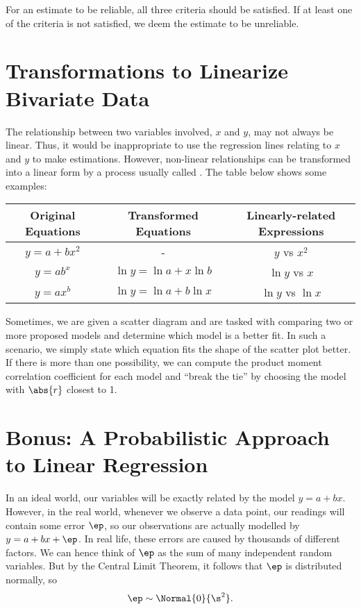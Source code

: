 For an estimate to be reliable, all three criteria should be satisfied. If at least one of the criteria is not satisfied, we deem the estimate to be unreliable.

\section{Transformations to Linearize Bivariate Data}

The relationship between two variables involved, $x$ and $y$, may not always be linear. Thus, it would be inappropriate to use the regression lines relating to $x$ and $y$ to make estimations. However, non-linear relationships can be transformed into a linear form by a process usually called . The table below shows some examples:

\begin{table}[H]
    \centering
    \begin{tabular}{|c|c|c|}
        \hline
        \textbf{Original Equations} & \textbf{Transformed Equations} & \textbf{Linearly-related Expressions} \\ \hline
        $y = a + bx^2$ & - & $y$ vs $x^2$ \\ \hline
        $y = ab^x$ & $\ln y = \ln a + x \ln b$ & $\ln y$ vs $x$ \\ \hline
        $y = ax^b$ & $\ln y = \ln a + b \ln x$ & $\ln y$ vs $\ln x$ \\ \hline
    \end{tabular}
\end{table}

Sometimes, we are given a scatter diagram and are tasked with comparing two or more proposed models and determine which model is a better fit. In such a scenario, we simply state which equation fits the shape of the scatter plot better. If there is more than one possibility, we can compute the product moment correlation coefficient for each model and ``break the tie'' by choosing the model with $\abs{r}$ closest to 1.

\section{Bonus: A Probabilistic Approach to Linear Regression}

In an ideal world, our variables will be exactly related by the model $y = a + bx$. However, in the real world, whenever we observe a data point, our readings will contain some error $\ep$, so our observations are actually modelled by $y = a + bx + \ep$. In real life, these errors are caused by thousands of different factors. We can hence think of $\ep$ as the sum of many independent random variables. But by the Central Limit Theorem, it follows that $\ep$ is distributed normally, so \[\ep \sim \Normal{0}{\s^2}.\]

